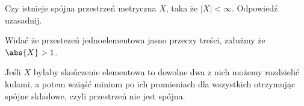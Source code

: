 \documentclass[11pt]{scrartcl}
\begin{document}
    \begin{zadanie*}
        Czy istnieje spójna przestrzeń metryczna $X$, taka że $|X| < \infty$. Odpowiedź uzasadnij.
    \end{zadanie*}

    Widać że przestezeń jednoelementowa jasno przeczy treści, załużmy że $\abs{X} > 1$.

    Jeśli $X$ byłaby skończenie elementowa to dowolne dwa z nich możemy rozdzielić kulami, a potem wziąść minium po ich promieniach dla wszystkich otrzymując spójne składowe, czyli przestrzeń nie jest spójna. 
    
\end{document}
